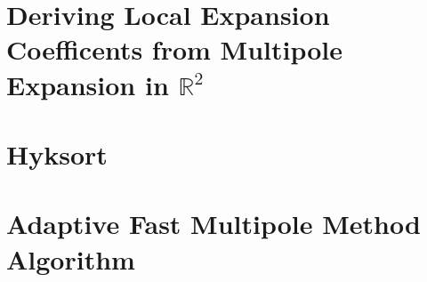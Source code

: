 
\chapter{Deriving Local Expansion Coefficents from Multipole Expansion in $\mathbb{R}^2$}\label{app:locals}


\chapter{Hyksort}\label{app:hyksort}


\chapter{Adaptive Fast Multipole Method Algorithm}\label{app:adaptive_fmm}

